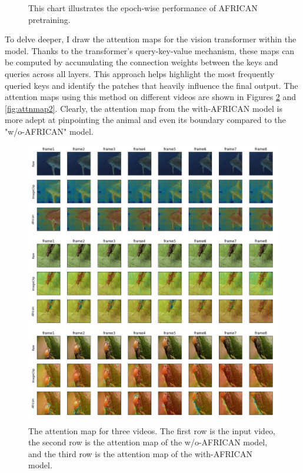 \begin{figure}[ht]
    \centering
    \resizebox{1.0\textwidth}{!}{}
    \caption[Accuracy on each epoch for AFRICAN Pretraining]{This chart illustrates the epoch-wise performance of AFRICAN pretraining.}
    \label{fig:tp_africanpretraining}
\end{figure}

To delve deeper, I draw the attention maps for the vision transformer within the model. Thanks to the transformer's query-key-value mechanism, these maps can be computed by accumulating the connection weights between the keys and queries across all layers. This approach helps highlight the most frequently queried keys and identify the patches that heavily influence the final output. The attention maps using this method on different videos are shown in Figures \ref{fig:attnmap1} and \ref{fig:attnmap2}. Clearly, the attention map from the with-AFRICAN model is more  adept at pinpointing the animal and even its boundary compared to the "w/o-AFRICAN" model.

\begin{figure}[ht]
    \centering
    \includegraphics[width=1.0\textwidth]{assets/imgs/5_4_AttentionMaps_1}
    \caption[Attention Map 1]{The attention map for three videos. The first row is the input video, the second row is the attention map of the w/o-AFRICAN model, and the third row is the attention map of the with-AFRICAN model.}
    \label{fig:attnmap1}
\end{figure}

